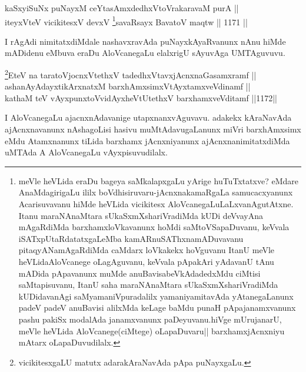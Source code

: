 
\begin{shl}
kaSxyiSuNx puNayxM ceYtasAmxdedhxVtoVrakaravaM purA ||  \\
iteyxVteV vicikitesxV devxV \footnote{meVle heVLida eraDu bageya saMkalapxgaLu yArige huTuTxtatxve? eMdare AnaMdagirigaLu ililx boVdhisiruvaru-jAcnxnakamaRgaLa samucacxyanunx Acarisuvavanu hiMde heVLida vicikitesx AloVcanegaLuLaLxvanAgutAtxne. Itanu maraNAnaMtara sUkaSxmXshariVradiMda kUDi deVvayAna mAgaRdiMda barxhamxloVkavanunx hoMdi saMtoVSapaDuvanu, keVvala iSATxpUtaRdatatxgaLeMba kamARnuSAThxna\-\break mADuvavanu pitaqyANamAgaRdiMda caMdarx loVkakekx hoVguvanu ItanU meVle heVLida\break AloVcanege oLagAguvanu, keVvala pApakAri yAdavanU tAnu mADida pApavanunx muMde anuBavisabeVkAdadedxMdu ciMtisi saMtapisuvanu, ItanU saha maraNAnaMtara sUkaSxmXshariVradiMda kUDidavanAgi saMyamaniVpuradalilx yamaniyamitavAda yAtanegaLanunx padeV padeV anuBavisi alilxMda keLage baMdu punaH pApajanamxvanunx pashu pakiSx modalAda janamxvanunx paDeyuvanu.hiVge mUrujanarU, meVle heVLida AloVcanege(ciMtege) oLapaDuvaru|| barxhamxjAcnxniyu mAtarx oLapaDuvudilalx.}savaRsayx BavatoV maqtw \hfill || 1171 ||  
\end{shl}


\begin{artha}
I rAgAdi nimitatxdiMdale nashavxravAda puNayxkAyaRvanunx nAnu hiMde mADidenu eMbuva eraDu AloVcanegaLu elalxrigU sAyuvAga UMTAguvuvu.
\end{artha}


\begin{shl}
\footnote{vicikitesxgaLU matutx adarakAraNavAda pApa puNayxgaLu.}EteV na taratoV\s jocnxVtethxV tadedhxVtavxjAcnxnaGasamxramf || \\
ashanAyAdayxtikArxnatxM barxhAmxsimxVtAyxtamxveVdinamf || \\
kathaM teV vAyxpunxtoV\s vidAyxheVtUtethxV barxhamxveVditamf \hfill ||1172||  
\end{shl}

\begin{artha}
I AloVcanegaLu ajacnxnAdavanige utapxnanxvAguvavu. adakekx kAraNavAda ajAcnxnavanunx nAshagoLisi hasivu muMtAdavugaLanunx miVri barxhAmxsimx eMdu Atamxnanunx tiLida barxhamx jAcnxniyanunx ajAcnxnanimitatxdiMda uMTAda A AloVcanegaLu vAyxpisuvudilalx.
\end{artha}


